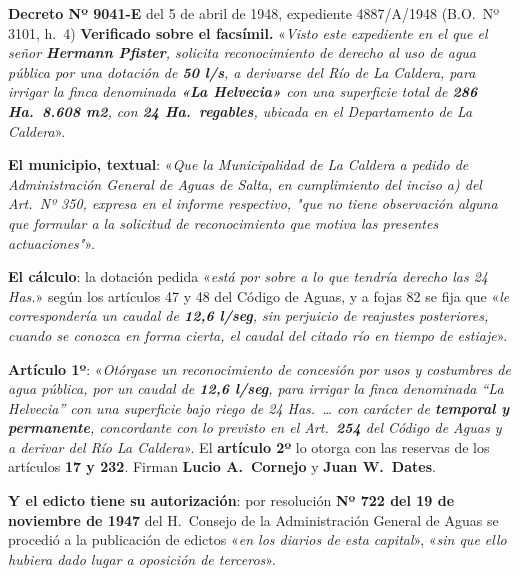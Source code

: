 \begin{ficha}{\textbf{Decreto Nº 9041-E} del 5 de abril de 1948, expediente 4887/A/1948 (B.O.\ Nº 3101, h.\ 4)}
\textbf{Verificado sobre el facsímil.} «\textit{Visto este expediente en el que el señor
\textbf{Hermann Pfister}, solicita reconocimiento de derecho al uso de agua pública por una
dotación de \textbf{50 l/s}, a derivarse del Río de La Caldera, para irrigar la finca
denominada \textbf{«La Helvecia»} con una superficie total de \textbf{286 Ha.\ 8.608 m2}, con
\textbf{24 Ha.\ regables}, ubicada en el Departamento de La Caldera}».

\textbf{El municipio, textual}: «\textit{Que la Municipalidad de La Caldera a pedido de
Administración General de Aguas de Salta, en cumplimiento del inciso a) del Art.\ Nº 350,
expresa en el informe respectivo, "que no tiene observación alguna que formular a la
solicitud de reconocimiento que motiva las presentes actuaciones"}».

\textbf{El cálculo}: la dotación pedida «\textit{está por sobre a lo que tendría derecho las
24 Has.}» según los artículos 47 y 48 del Código de Aguas, y a fojas 82 se fija que
«\textit{le correspondería un caudal de \textbf{12,6 l/seg}, sin perjuicio de reajustes
posteriores, cuando se conozca en forma cierta, el caudal del citado río en tiempo de
estiaje}».

\textbf{Artículo 1º}: «\textit{Otórgase un reconocimiento de concesión por usos y costumbres
de agua pública, por un caudal de \textbf{12,6 l/seg}, para irrigar la finca denominada ``La
Helvecia'' con una superficie bajo riego de 24 Has.\ \ldots{} con carácter de \textbf{temporal y
permanente}, concordante con lo previsto en el Art.\ \textbf{254} del Código de Aguas y a
derivar del Río La Caldera}». El \textbf{artículo 2º} lo otorga con las reservas de los
artículos \textbf{17 y 232}. Firman \textbf{Lucio A.\ Cornejo} y \textbf{Juan W.\ Dates}.

\textbf{Y el edicto tiene su autorización}: por resolución \textbf{Nº 722 del 19 de noviembre
de 1947} del H.\ Consejo de la Administración General de Aguas se procedió a la publicación
de edictos «\textit{en los diarios de esta capital}», «\textit{sin que ello hubiera dado
lugar a oposición de terceros}».
\end{ficha}

